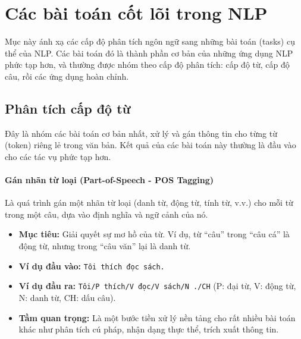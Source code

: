 
\section{Các bài toán cốt lõi trong NLP}
\label{sec:bai_toan_cot_loi}

Mục này ánh xạ các cấp độ phân tích ngôn ngữ sang những bài toán (tasks) cụ thể của NLP. Các bài toán đó là thành phần cơ bản của những ứng dụng NLP phức tạp hơn, và thường được nhóm theo cấp độ phân tích: cấp độ từ, cấp độ câu, rồi các ứng dụng hoàn chỉnh.

\subsection{Phân tích cấp độ từ}
\label{ssec:phan_tich_tu}

Đây là nhóm các bài toán cơ bản nhất, xử lý và gán thông tin cho từng từ (token) riêng lẻ trong văn bản. Kết quả của các bài toán này thường là đầu vào cho các tác vụ phức tạp hơn.

\paragraph{Gán nhãn từ loại (Part-of-Speech - POS Tagging)}
Là quá trình gán một nhãn từ loại (danh từ, động từ, tính từ, v.v.) cho mỗi từ trong một câu, dựa vào định nghĩa và ngữ cảnh của nó.
\begin{itemize}
    \item \textbf{Mục tiêu:} Giải quyết sự mơ hồ của từ. Ví dụ, từ “câu” trong “câu cá” là động từ, nhưng trong “câu văn” lại là danh từ.
    \item \textbf{Ví dụ đầu vào:} \texttt{Tôi thích đọc sách.}
    \item \textbf{Ví dụ đầu ra:} \texttt{Tôi/P thích/V đọc/V sách/N ./CH} (P: đại từ, V: động từ, N: danh từ, CH: dấu câu).
    \item \textbf{Tầm quan trọng:} Là một bước tiền xử lý nền tảng cho rất nhiều bài toán khác như phân tích cú pháp, nhận dạng thực thể, trích xuất thông tin.
\end{itemize}

